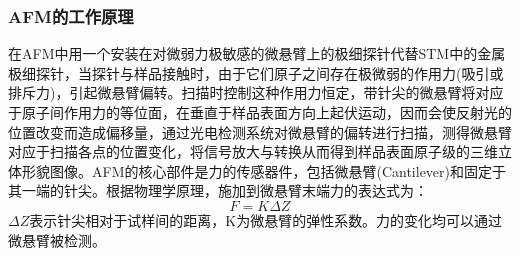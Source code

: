 \documentclass[a4paper]{article}
\begin{document}
\subsubsection{AFM的工作原理}
在AFM中用一个安装在对微弱力极敏感的微悬臂上的极细探针代替STM中的金属极细探针，当探针与样品接触时，由于它们原子之间存在极微弱的作用力(吸引或排斥力)，引起微悬臂偏转。扫描时控制这种作用力恒定，带针尖的微悬臂将对应于原子间作用力的等位面，在垂直于样品表面方向上起伏运动，因而会使反射光的位置改变而造成偏移量，通过光电检测系统对微悬臂的偏转进行扫描，测得微悬臂对应于扫描各点的位置变化，将信号放大与转换从而得到样品表面原子级的三维立体形貌图像。AFM的核心部件是力的传感器件，包括微悬臂(Cantilever)和固定于其一端的针尖。根据物理学原理，施加到微悬臂末端力的表达式为：
\begin{equation}
F = K\Delta Z\label{eq1}
\end{equation}
$\Delta Z$表示针尖相对于试样间的距离，K为微悬臂的弹性系数。力的变化均可以通过微悬臂被检测。
\end{document}
